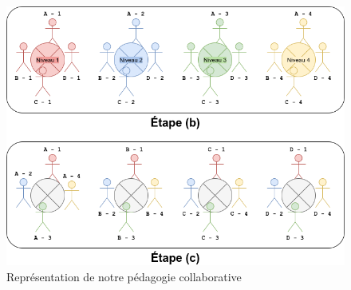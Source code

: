 \begin{figure}[h!]
	\includegraphics[width=\textwidth]{res/diagramme.drawio}
	\caption{Représentation de notre pédagogie collaborative}\label{SchémaNotreJigsaw}
\end{figure}

